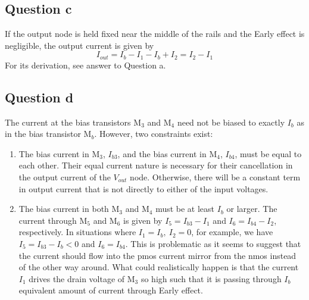 \documentclass[11pt]{article}
\begin{document}
    \subsection{Question c}
    If the output node is held fixed near the middle of the rails and the Early effect is negligible, the output current is given by
    \begin{equation}
        I_{out}=I_b-I_1-I_b+I_2=I_2-I_1
    \end{equation}
    For its derivation, see answer to Question a.
    
    \subsection{Question d}
    The current at the bias transistors M$_3$ and M$_4$ need not be biased to exactly $I_b$ as in the bias transistor M$_b$. However, two constraints exist:
    \begin{enumerate}
        \item The bias current in M$_3$, $I_{b3}$, and the bias current in M$_4$, $I_{b4}$, must be equal to each other. Their equal current nature is necessary for their cancellation in the output current of the $V_{out}$ node. Otherwise, there will be a constant term in output current that is not directly to either of the input voltages.
        \item The bias current in both M$_3$ and M$_4$ must be at least $I_b$ or larger. The current through M$_5$ and M$_6$ is given by $I_5=I_{b3}-I_1$ and $I_6=I_{b4}-I_2$, respectively. In situations where $I_1=I_b,\ I_2=0$, for example, we have $I_5=I_{b3}-I_b<0$ and $I_6=I_{b4}$. This is problematic as it seems to suggest that the current should flow into the pmos current mirror from the nmos instead of the other way around. What could realistically happen is that the current $I_1$ drives the drain voltage of M$_3$ so high such that it is passing through $I_b$ equivalent amount of current through Early effect.
    \end{enumerate}
\end{document}
